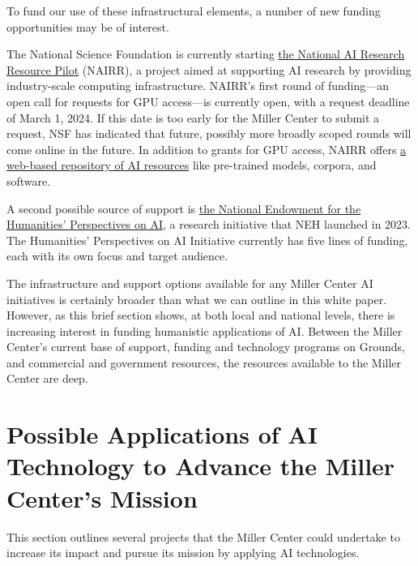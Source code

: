 \documentclass[12pt, oneside]{article}   	%
\begin{document}
To fund our use of these infrastructural elements, a number of new funding opportunities may be of interest.  

The National Science Foundation is currently starting \href{https://nairrpilot.org}{the National AI Research Resource Pilot} (NAIRR),  a project aimed at supporting AI research by providing industry-scale computing infrastructure.  NAIRR's first round of funding---an open call for requests for GPU access---is currently open, with a request deadline of March 1, 2024.  If this date is too early for the Miller Center to submit a request, NSF has indicated that future, possibly more broadly scoped rounds will come online in the future.  In addition to grants for GPU access, NAIRR offers \href{https://nairrpilot.org/pilot-resources}{a web-based repository of AI resources} like pre-trained models, corpora, and software.  

A second possible source of support is \href{https://www.neh.gov/AI}{the National Endowment for the Humanities' Perspectives on AI}, a research initiative that NEH launched in 2023. The Humanities' Perspectives on AI Initiative currently has five lines of funding, each with its own focus and target audience.  

The infrastructure and support options available for any Miller Center AI initiatives is certainly broader than what we can outline in this white paper.  However, as this brief section shows, at both local and national levels, there is increasing interest in funding humanistic applications of AI.  Between the Miller Center's current base of support, funding and technology programs on Grounds, and commercial and government resources, the resources available to the Miller Center are deep.
 


\section{Possible Applications of AI Technology to Advance the Miller Center's Mission}\label{section.applications}
This section outlines several projects that the Miller Center could undertake to increase its impact and pursue its mission by applying AI technologies.   
\end{document}
